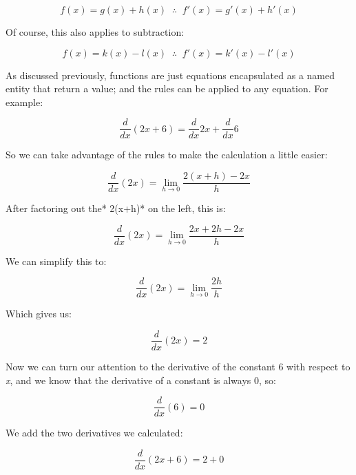 \documentclass[11pt]{article}
\begin{document}
\begin{equation}f(x) = g(x) + h(x) \;\; \therefore \;\; f'(x) = g'(x) + h'(x) \end{equation}

Of course, this also applies to subtraction:

\begin{equation}f(x) = k(x) - l(x) \;\; \therefore \;\; f'(x) = k'(x) - l'(x) \end{equation}

As discussed previously, functions are just equations encapsulated as a
named entity that return a value; and the rules can be applied to any
equation. For example:

\begin{equation}\frac{d}{dx}(2x + 6) = \frac{d}{dx} 2x +  \frac{d}{dx} 6\end{equation}

So we can take advantage of the rules to make the calculation a little
easier:

\begin{equation}\frac{d}{dx}(2x) = \lim_{h \to 0} \frac{2(x+h) - 2x}{h} \end{equation}

After factoring out the* 2(x+h)* on the left, this is:

\begin{equation}\frac{d}{dx}(2x) = \lim_{h \to 0} \frac{2x + 2h - 2x}{h} \end{equation}

We can simplify this to:

\begin{equation}\frac{d}{dx}(2x) = \lim_{h \to 0} \frac{2h}{h} \end{equation}

Which gives us:

\begin{equation}\frac{d}{dx}(2x) = 2 \end{equation}

Now we can turn our attention to the derivative of the constant 6 with
respect to \emph{x}, and we know that the derivative of a constant is
always 0, so:

\begin{equation}\frac{d}{dx}(6) = 0\end{equation}

We add the two derivatives we calculated:

\begin{equation}\frac{d}{dx}(2x + 6) = 2 + 0\end{equation}
\end{document}
